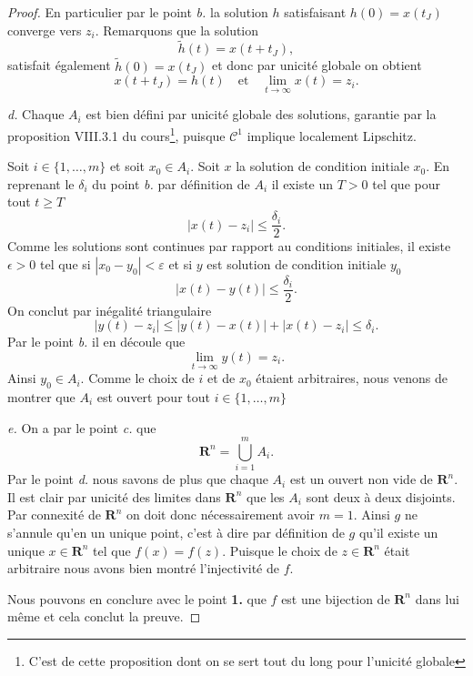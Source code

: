 \documentclass[12pt]{article}
\newcommand{\R}{\mathbf{R}}
\begin{document}
\begin{proof}
En particulier par le point \textit{b.} la solution $h$ satisfaisant  $h(0) = x(t_{J})$ converge vers $z_{i}$. Remarquons que la solution \[
        \tilde{h}(t) = x(t + t_{J})
,\] satisfait également $\tilde{h}(0) = x(t_{J})$ et donc par unicité globale on obtient \[
x(t + t_{J}) = h(t) \quad \text{et} \quad \lim_{t\to \infty}x(t) = z_{i}
.\]  

\medskip

\textit{d.} Chaque $A_{i}$ est bien défini par unicité globale des solutions, garantie par la proposition VIII.3.1 du cours\footnote{C'est de cette proposition dont on se sert tout du long pour l'unicité globale}, puisque $\mathcal{C}^{1}$ implique localement Lipschitz.

Soit $i \in \{1, \ldots, m\}$ et soit $x_0 \in A_{i}$. Soit $x$ la solution de condition initiale  $x_0$. En reprenant le $\delta_{i}$ du point \textit{b.} par définition de $A_{i}$ il existe un $T > 0$ tel que pour tout $t \ge T$ \[
        |x(t) - z_{i}| \le \frac{\delta_{i}}{2}
.\] Comme les solutions sont continues par rapport au conditions initiales, il existe $\epsilon > 0$ tel que si $|x_0 - y_0| < \varepsilon$ et si $y$ est solution de condition initiale $y_0$ \[
|x(t) - y(t)| \le \frac{\delta_{i}}{2} 
.\]  
On conclut par inégalité triangulaire \[
        |y(t) - z_{i}| \le |y(t) - x(t)| + |x(t) - z_{i}| \le \delta_{i}
.\]
Par le point \textit{b.} il en découle que \[
        \lim_{t\to \infty}y(t) = z_{i}
.\] Ainsi $y_0 \in A_{i}$. Comme le choix de $i$ et de $x_0$ étaient arbitraires, nous venons de montrer que $A_{i}$ est ouvert pour tout $i \in \{1, \ldots, m\}$ 

\medskip

\textit{e.} On a par le point \textit{c.} que \[
\R^{n} = \bigcup_{i=1}^{m}A_{i}
.\] Par le point \textit{d.} nous savons de plus que chaque $A_{i}$ est un ouvert non vide de $\R^{n}$. Il est clair par unicité des limites dans $\R^{n}$ que les $A_{i}$ sont deux à deux disjoints. Par connexité de $\R^{n}$ on doit donc nécessairement avoir $m = 1$. Ainsi $g$ ne s'annule qu'en un unique point, c'est à dire par définition de $g$ qu'il existe un unique $x \in \R^{n}$ tel que $f(x) = f(z)$. Puisque le choix de $z \in \R^{n}$ était arbitraire nous avons bien montré l'injectivité de $f$.

Nous pouvons en conclure avec le point \textbf{1.} que $f$ est une bijection de $\R^{n}$ dans lui même et cela conclut la preuve.
\end{proof}

\bigskip
\end{document}
